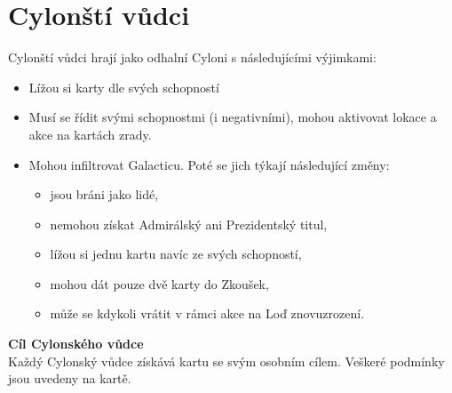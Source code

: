 \documentclass[a4paper,twocolumn]{article}
\begin{document}
\section{Cylonští vůdci}
Cylonští vůdci hrají jako odhalní Cyloni s následujícími výjimkami:
\begin{itemize}
	\item Lížou si karty dle svých schopností
	\item Musí se řídit svými schopnostmi (i negativními), mohou aktivovat lokace a akce na kartách zrady.
	\item Mohou infiltrovat Galacticu. Poté se jich týkají následující změny:
	\begin{itemize}
		\item jsou bráni jako lidé,
		\item nemohou získat Admirálský ani Prezidentský titul,
		\item lížou si jednu kartu navíc ze svých schopností,
		\item mohou dát pouze dvě karty do Zkoušek,
		\item může se kdykoli vrátit v rámci akce na Loď znovuzrození.
	\end{itemize}
\end{itemize}
\textbf{Cíl Cylonského vůdce}\\
Každý Cylonský vůdce získává kartu se svým osobním cílem. Veškeré podmínky jsou uvedeny na kartě.
\end{document}
